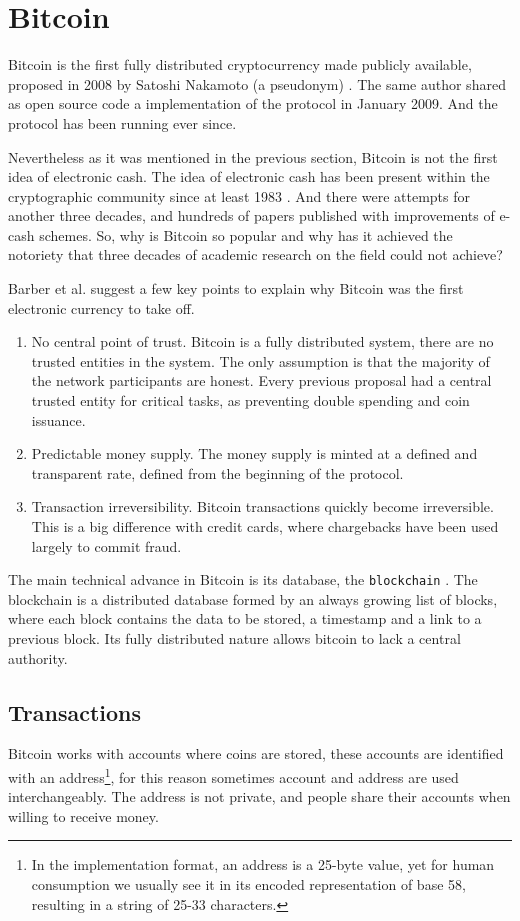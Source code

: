 \section{Bitcoin}
Bitcoin is the first fully distributed cryptocurrency made publicly available,
  proposed in 2008 by Satoshi Nakamoto (a pseudonym) \cite{nakamoto2008bitcoin}.
The same author shared as open source code a implementation of the protocol in
  January 2009. And the protocol has been running ever since.

Nevertheless as it was mentioned in the previous section, Bitcoin is not the
  first idea of electronic cash.
The idea of electronic cash has been present within the cryptographic community
  since at least 1983 \cite{chaum1983blind}.
And there were attempts for another three decades, and hundreds of papers
  published with improvements of e-cash schemes\cite{barber2012bitter}.
So, why is Bitcoin so popular and why has it achieved the notoriety that three
  decades of academic research on the field could not achieve?

Barber et al. \cite{barber2012bitter} suggest a few key points to explain why
  Bitcoin was the first electronic currency to take off.
\begin{enumerate}
\item No central point of trust.
	Bitcoin is a fully distributed system, there are no trusted entities in the
	  system. The only assumption is that the majority of the network participants
	  are honest. Every previous proposal had a central trusted entity for
	  critical tasks, as preventing double spending and coin issuance.
\item Predictable money supply.
	The money supply is minted at a defined and transparent rate, defined from
	  the beginning of the protocol.
\item Transaction irreversibility.
	Bitcoin transactions quickly become irreversible. This is a big difference
	  with credit cards, where chargebacks have been used largely to commit
	  fraud.
\end{enumerate}

  The main technical advance in Bitcoin is its database, the
  \texttt{blockchain} \cite{inventionblockchain,blockchainmostimportant}.
The blockchain is a distributed database formed by an always growing list of
  blocks, where each block contains the data to be stored, a timestamp and a
  link to a previous block. Its fully distributed nature allows bitcoin to lack
  a central authority.

\subsection{Transactions}\label{subsec:Transaction}
Bitcoin works with accounts where coins are stored, these accounts are
  identified with an address\footnote{In the implementation format, an address
    is a 25-byte value, yet for human consumption we usually see it in its
    encoded representation of base 58, resulting in a string of 25-33
    characters.}, for this reason sometimes account and address are used
    interchangeably.
The address is not private, and people share their accounts when willing to
  receive money.

